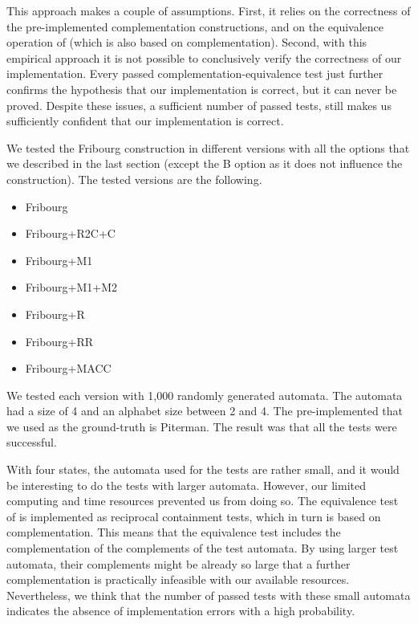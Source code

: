 This approach makes a couple of assumptions. First, it relies on the correctness of the pre-implemented complementation constructions, and on the equivalence operation of \goal{} (which is also based on complementation). Second, with this empirical approach it is not possible to conclusively verify the correctness of our implementation. Every passed complementation-equivalence test just further confirms the hypothesis that our implementation is correct, but it can never be proved. Despite these issues, a sufficient number of passed tests, still makes us sufficiently confident that our implementation is correct.

We tested the Fribourg construction in different versions with all the options that we described in the last section (except the B option as it does not influence the construction). The tested versions are the following.
\begin{itemize}
\item Fribourg
\item Fribourg+R2C+C
\item Fribourg+M1
\item Fribourg+M1+M2
\item Fribourg+R
\item Fribourg+RR
\item Fribourg+MACC
\end{itemize}

We tested each version with 1,000 randomly generated automata. The automata had a size of 4 and an alphabet size between 2 and 4. The pre-implemented that we used as the ground-truth is Piterman. The result was that all the tests were successful. 

With four states, the automata used for the tests are rather small, and it would be interesting to do the tests with larger automata. However, our limited computing and time resources prevented us from doing so. The equivalence test of \goal{} is implemented as reciprocal containment tests, which in turn is based on complementation. This means that the equivalence test includes the complementation of the complements of the test automata. By using larger test automata, their complements might be already so large that a further complementation is practically infeasible with our available resources. Nevertheless, we think that the number of passed tests with these small automata indicates the absence of implementation errors with a high probability.


